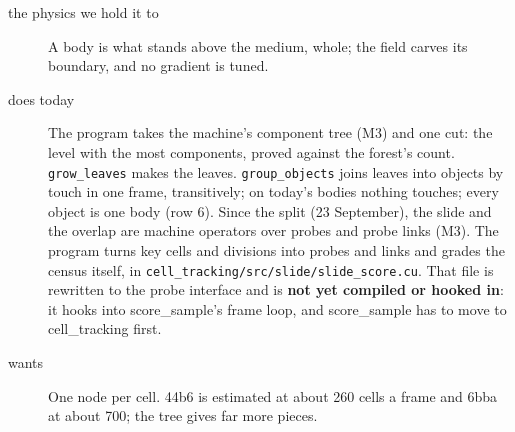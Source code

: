\begin{description}
\item[{the physics we hold it to}] A body is what stands above the medium, whole; the field carves its boundary, and no gradient is tuned.
\item[{does today}] The program takes the machine's component tree (M3) and one cut: the level with the most components, proved against the forest's count. \texttt{grow\_\allowbreak{}leaves} makes the leaves. \texttt{group\_\allowbreak{}objects} joins leaves into objects by touch in one frame, transitively; on today's bodies nothing touches; every object is one body (row 6). Since the split (23 September), the slide and the overlap are machine operators over probes and probe links (M3). The program turns key cells and divisions into probes and links and grades the census itself, in \texttt{cell\_\allowbreak{}tracking/\allowbreak{}src/\allowbreak{}slide/\allowbreak{}slide\_\allowbreak{}score.\allowbreak{}cu}. That file is rewritten to the probe interface and is \textbf{not yet compiled or hooked in}: it hooks into score\_\allowbreak{}sample's frame loop, and score\_\allowbreak{}sample has to move to cell\_\allowbreak{}tracking first.
\item[{wants}] One node per cell. 44b6 is estimated at about 260 cells a frame and 6bba at about 700; the tree gives far more pieces.

\end{description}
